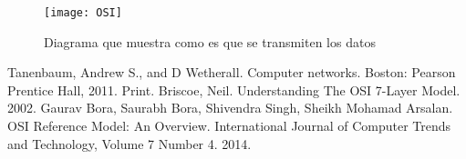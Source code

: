 \begin{figure}[!ht]
\centering
\texttt{[image: OSI]}
\caption{Diagrama que muestra como es que se transmiten los datos}
\end{figure}
\pagebreak


\begin{thebibliography}{9}
Tanenbaum, Andrew S., and D Wetherall. Computer networks. Boston: Pearson Prentice Hall, 2011. Print.
Briscoe, Neil. Understanding The OSI 7-Layer Model. 2002.
Gaurav Bora, Saurabh Bora, Shivendra Singh, Sheikh Mohamad Arsalan. OSI Reference Model: An Overview. International Journal of Computer Trends and Technology, Volume 7 Number 4. 2014.


\end{thebibliography}

